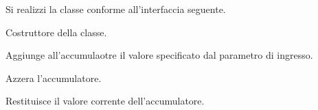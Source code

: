 Si realizzi la classe  conforme all'interfaccia seguente.

\begin{methodslist}

 {
Costruttore della classe.
}

 {
Aggiunge all'accumulaotre il valore specificato dal parametro di ingresso.
}

 {
Azzera l'accumulatore.
}

 {
Restituisce il valore corrente dell'accumulatore.
}

\end{methodslist}